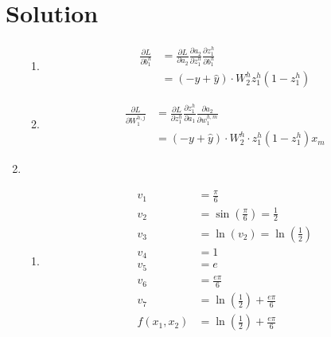 \documentclass[submit]{harvardml}
\newenvironment{answer}
  {\section*{Solution}}
{}
\begin{document}
\begin{answer}
\begin{enumerate}
\begin{enumerate}
            \item
                  \begin{align*}
                    \frac {\partial L}{\partial b_1^h} & = \frac{\partial L}{\partial a_2} \frac{\partial a_2}{\partial z_1^h}\frac{\partial z_1^h}{\partial b_1^h} \\
                    & = (-y + \hat{y}) \cdot W_2^h z_1^h (1-z_1^h)
                  \end{align*}

            \item
                  \begin{align*}
                    \frac {\partial L}{\partial W_1^{h,j}} & = \frac{\partial L}{\partial z_1^h} \frac{\partial z_1^h}{\partial a_1}\frac{\partial a_2}{\partial w_1^{h,m}}\\
                    & = (-y + \hat{y}) \cdot W_2^h \cdot z_1^h (1- z_1^h) x_m
                  \end{align*}
          \end{enumerate}

    \item

          \begin{enumerate}
            \item
                  \begin{align*}
                    v_1        & = \frac{\pi}{6}\\
                    v_2        & = \sin(\frac{\pi}{6}) = \frac{1}{2}\\
                    v_3        & = \ln(v_2) = \ln(\frac{1}{2})\\
                    v_4        & = 1\\
                    v_5        & = e\\
                    v_6        & = \frac{e \pi}{6}\\
                    v_7        & = \ln(\frac{1}{2}) + \frac{e \pi}{6}\\
                    f(x_1,x_2) & = \ln(\frac{1}{2}) + \frac{e \pi}{6}\\
                  \end{align*}


\end{enumerate}
\end{enumerate}
\end{answer}
\end{document}
